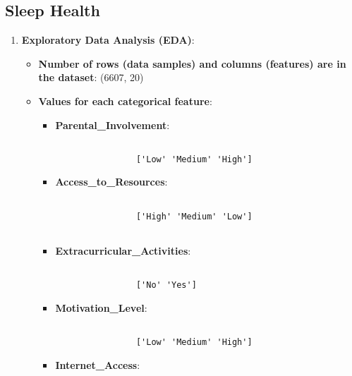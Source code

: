 \documentclass{article}
\begin{document}
\subsection*{Sleep Health}
\begin{enumerate}
    \item \textbf{Exploratory Data Analysis (EDA)}:
    
    \begin{itemize}

        \item \textbf{Number of rows (data samples) and columns (features) are in the dataset}: (6607, 20)
     
        \item \textbf{Values for each categorical feature}:
        \begin{itemize}

            \item \textbf{Parental\_Involvement}:
            \begin{verbatim}

                ['Low' 'Medium' 'High']

            \end{verbatim}

            \item \textbf{Access\_to\_Resources}:
            \begin{verbatim}

                ['High' 'Medium' 'Low']


            \end{verbatim}

            \item \textbf{Extracurricular\_Activities}:
            \begin{verbatim}

                ['No' 'Yes']

            \end{verbatim}

            \item \textbf{Motivation\_Level}:
            \begin{verbatim}

                ['Low' 'Medium' 'High']

            \end{verbatim}

            \item \textbf{Internet\_Access}:
            \begin{verbatim}


\end{verbatim}
\end{itemize}
\end{itemize}
\end{enumerate}
\end{document}
